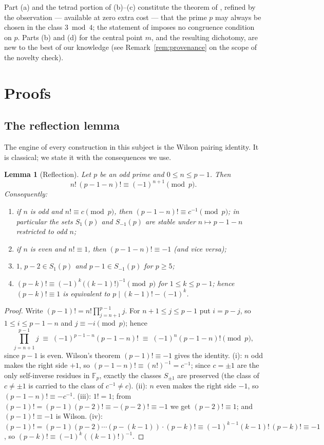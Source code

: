 \documentclass[11pt]{article}
\newtheorem{lemma}[theorem]{Lemma}
\theoremstyle{definition}
\theoremstyle{remark}
\newcommand{\F}{\mathbb{F}}
\begin{document}
Part (a) and the tetrad portion of (b)--(c) constitute the theorem of
\cite{AAHS}, refined by the observation --- available at zero extra cost ---
that the prime $p$ may always be chosen in the class $3 \bmod 4$; the
statement of \cite{AAHS} imposes no congruence condition on $p$. Parts (b)
and (d) for the central point $m$, and the resulting dichotomy, are new to
the best of our knowledge (see Remark~\ref{rem:provenance} on the scope of
the novelty check).

\section{Proofs}\label{sec:proofs}

\subsection{The reflection lemma}

The engine of every construction in this subject is the Wilson pairing
identity. It is classical; we state it with the consequences we use.

\begin{lemma}[Reflection]\label{lem:reflection}
Let $p$ be an odd prime and $0 \le n \le p-1$. Then
\[
  n! \, (p-1-n)! \equiv (-1)^{n+1} \pmod p.
\]
Consequently:
\begin{enumerate}
  \item[(i)] if $n$ is odd and $n! \equiv c \pmod p$, then
    $(p-1-n)! \equiv c^{-1} \pmod p$; in particular the sets $S_1(p)$ and
    $S_{-1}(p)$ are stable under $n \mapsto p-1-n$ restricted to odd $n$;
  \item[(ii)] if $n$ is even and $n! \equiv 1$, then $(p-1-n)! \equiv -1$
    (and vice versa);
  \item[(iii)] $1, \, p-2 \in S_1(p)$ and $p-1 \in S_{-1}(p)$ for $p \ge 5$;
  \item[(iv)] $(p-k)! \equiv (-1)^k \, \bigl((k-1)!\bigr)^{-1} \pmod p$ for
    $1 \le k \le p-1$; hence $(p-k)! \equiv 1$ is equivalent to
    $p \mid (k-1)! - (-1)^k$.
\end{enumerate}
\end{lemma}

\begin{proof}
Write $(p-1)! = n! \prod_{j=n+1}^{p-1} j$. For $n+1 \le j \le p-1$ put
$i = p - j$, so $1 \le i \le p-1-n$ and $j \equiv -i \pmod p$; hence
\[
  \prod_{j=n+1}^{p-1} j \;\equiv\; (-1)^{p-1-n} (p-1-n)! \;\equiv\;
  (-1)^{n} (p-1-n)! \pmod p,
\]
since $p - 1$ is even. Wilson's theorem $(p-1)! \equiv -1$ gives the
identity. (i): $n$ odd makes the right side $+1$, so
$(p-1-n)! \equiv (n!)^{-1} = c^{-1}$; since $c = \pm 1$ are the only
self-inverse residues in $\F_p$, exactly the classes $S_{\pm 1}$ are
preserved (the class of $c \ne \pm 1$ is carried to the class of $c^{-1} \ne
c$). (ii): $n$ even makes the right side $-1$, so $(p-1-n)! \equiv -c^{-1}$.
(iii): $1! = 1$; from $(p-1)! = (p-1)(p-2)! \equiv -(p-2)! \equiv -1$ we get
$(p-2)! \equiv 1$; and $(p-1)! \equiv -1$ is Wilson.
(iv): $(p-1)! = (p-1)(p-2) \cdots (p-(k-1)) \cdot (p-k)! \equiv
(-1)^{k-1}(k-1)! \, (p-k)! \equiv -1$, so
$(p-k)! \equiv (-1)^k ((k-1)!)^{-1}$.
\end{proof}
\end{document}

